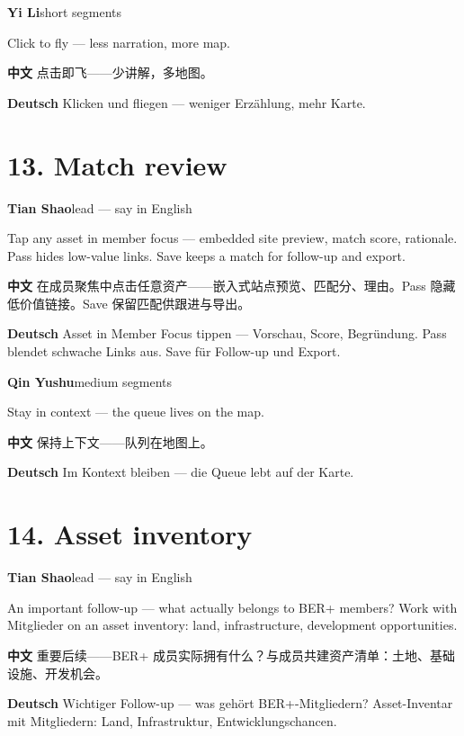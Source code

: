 \documentclass[11pt,a4paper]{ctexart}
\newenvironment{speakerblock}[2]{%
  \par\medskip
  {\color{berblue}\textbf{#1}}\hfill{\small\textcolor{bergrey}{#2}}\par
  \vspace{0.25em}
}{\par\medskip}
\begin{document}
\begin{speakerblock}{Yi Li}{short segments}
\begin{englishbox}
Click to fly — less narration, more map.
\end{englishbox}

\textbf{中文} 点击即飞——少讲解，多地图。

\textbf{Deutsch} Klicken und fliegen — weniger Erzählung, mehr Karte.
\end{speakerblock}



\section{13. Match review}

\begin{speakerblock}{Tian Shao}{lead — say in English}
\begin{englishbox}
Tap any asset in member focus — embedded site preview, match score, rationale. Pass hides low-value links. Save keeps a match for follow-up and export.
\end{englishbox}

\textbf{中文} 在成员聚焦中点击任意资产——嵌入式站点预览、匹配分、理由。Pass 隐藏低价值链接。Save 保留匹配供跟进与导出。

\textbf{Deutsch} Asset in Member Focus tippen — Vorschau, Score, Begründung. Pass blendet schwache Links aus. Save für Follow-up und Export.
\end{speakerblock}


\begin{speakerblock}{Qin Yushu}{medium segments}
\begin{englishbox}
Stay in context — the queue lives on the map.
\end{englishbox}

\textbf{中文} 保持上下文——队列在地图上。

\textbf{Deutsch} Im Kontext bleiben — die Queue lebt auf der Karte.
\end{speakerblock}



\section{14. Asset inventory}

\begin{speakerblock}{Tian Shao}{lead — say in English}
\begin{englishbox}
An important follow-up — what actually belongs to BER+ members? Work with Mitglieder on an asset inventory: land, infrastructure, development opportunities.
\end{englishbox}

\textbf{中文} 重要后续——BER+ 成员实际拥有什么？与成员共建资产清单：土地、基础设施、开发机会。

\textbf{Deutsch} Wichtiger Follow-up — was gehört BER+-Mitgliedern? Asset-Inventar mit Mitgliedern: Land, Infrastruktur, Entwicklungschancen.
\end{speakerblock}
\end{document}
